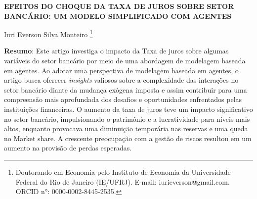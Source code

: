 \documentclass[hidelinks, article,12pt,oneside,a4paper,english,brazil,sumario=tradicional]{abntex2}
\begin{document}
\frenchspacing %

\begin{center}
	\uppercase{\bfseries{Efeitos do Choque da Taxa de juros sobre setor bancário: Um Modelo Simplificado com Agentes}}
	\vspace{12pt}
\end{center}





\begin{flushright}
	Iuri Everson Silva Monteiro \footnote{Doutorando em Economia pelo Instituto de Economia da Universidade Federal do Rio de Janeiro (IE/UFRJ). E-mail: iurieverson@gmail.com. ORCID n°: 0000-0002-8445-2535.}
\end{flushright}



\textual
\pagestyle{simple}

\noindent \textbf{Resumo}: Este artigo investiga o impacto da Taxa de juros sobre algumas variáveis do setor bancário por meio de uma abordagem de modelagem baseada em agentes. Ao adotar uma perspectiva de modelagem baseada em agentes, o artigo busca oferecer \textit{insights} valiosos sobre a complexidade das interações no setor bancário diante da mudança exógena imposta e assim contribuir para uma compreensão mais aprofundada dos desafios e oportunidades enfrentados pelas instituições financeiras. O aumento da taxa de juros teve um impacto significativo no setor bancário, impulsionando o patrimônio e a lucratividade para níveis mais altos, enquanto provocava uma diminuição temporária nas reservas e uma queda no Market share. A crescente preocupação com a gestão de riscos resultou em um aumento na provisão de perdas esperadas.

\end{document}
